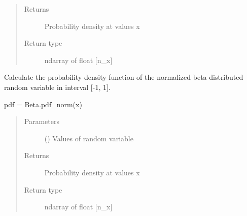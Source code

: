 \documentclass[letterpaper,10pt,english,openany,oneside]{sphinxmanual}
\begin{document}
\begin{fulllineitems}
\begin{fulllineitems}
\begin{quote}
\begin{description}
\item[{Returns}] \leavevmode
{} \textendash{} Probability density at values x

\item[{Return type}] \leavevmode
ndarray of float {[}n\_x{]}

\end{description}\end{quote}

\end{fulllineitems}


\begin{fulllineitems}
\label{\detokenize{pygpc:pygpc.RandomParameter.Beta.pdf_norm}}
Calculate the probability density function of the normalized beta distributed random variable in interval
{[}-1, 1{]}.

pdf = Beta.pdf\_norm(x)
\begin{quote}\begin{description}
\item[{Parameters}] \leavevmode
{} (\sphinxstyleliteralemphasis{\sphinxupquote{ {[}}}\sphinxstyleliteralemphasis{\sphinxupquote{{]}}}) \textendash{} Values of random variable

\item[{Returns}] \leavevmode
{} \textendash{} Probability density at values x

\item[{Return type}] \leavevmode
ndarray of float {[}n\_x{]}

\end{description}\end{quote}

\end{fulllineitems}


\end{fulllineitems}

\end{document}
